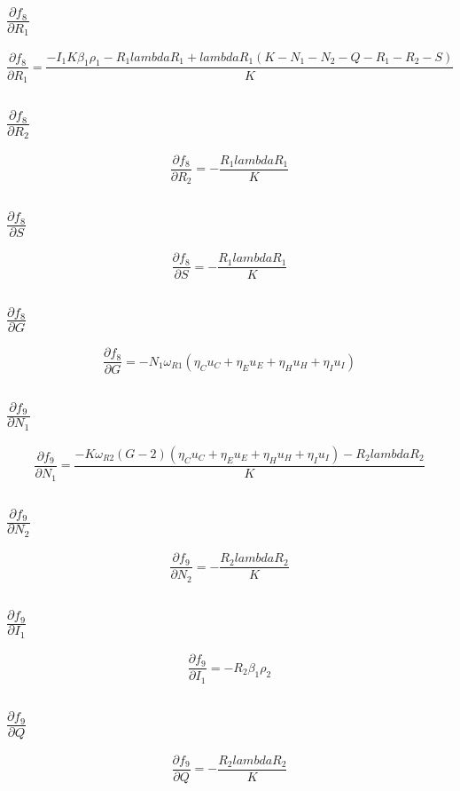 \documentclass{article}
\begin{document}
\subsection{$\frac{\partial f_{8}}{\partial R_1}$}
\[
\frac{\partial f_{8}}{\partial R_1} = \frac{- I_{1} K \beta_{1} \rho_{1} - R_{1} lambdaR_{1} + lambdaR_{1} \left(K - N_{1} - N_{2} - Q - R_{1} - R_{2} - S\right)}{K}
\]

\subsection{$\frac{\partial f_{8}}{\partial R_2}$}
\[
\frac{\partial f_{8}}{\partial R_2} = - \frac{R_{1} lambdaR_{1}}{K}
\]

\subsection{$\frac{\partial f_{8}}{\partial S}$}
\[
\frac{\partial f_{8}}{\partial S} = - \frac{R_{1} lambdaR_{1}}{K}
\]

\subsection{$\frac{\partial f_{8}}{\partial G}$}
\[
\frac{\partial f_{8}}{\partial G} = - N_{1} \omega_{R1} \left(\eta_{C} u_{C} + \eta_{E} u_{E} + \eta_{H} u_{H} + \eta_{I} u_{I}\right)
\]

\subsection{$\frac{\partial f_{9}}{\partial N_1}$}
\[
\frac{\partial f_{9}}{\partial N_1} = \frac{- K \omega_{R2} \left(G - 2\right) \left(\eta_{C} u_{C} + \eta_{E} u_{E} + \eta_{H} u_{H} + \eta_{I} u_{I}\right) - R_{2} lambdaR_{2}}{K}
\]

\subsection{$\frac{\partial f_{9}}{\partial N_2}$}
\[
\frac{\partial f_{9}}{\partial N_2} = - \frac{R_{2} lambdaR_{2}}{K}
\]

\subsection{$\frac{\partial f_{9}}{\partial I_1}$}
\[
\frac{\partial f_{9}}{\partial I_1} = - R_{2} \beta_{1} \rho_{2}
\]

\subsection{$\frac{\partial f_{9}}{\partial Q}$}
\[
\frac{\partial f_{9}}{\partial Q} = - \frac{R_{2} lambdaR_{2}}{K}
\]
\end{document}
